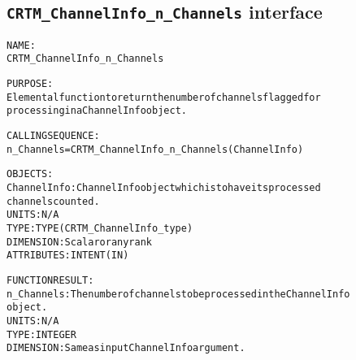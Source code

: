 \subsection{\texttt{CRTM\_ChannelInfo\_n\_Channels} interface}
  \label{sec:CRTM_ChannelInfo_n_Channels_interface}
  \begin{alltt}
 
  NAME:
        CRTM_ChannelInfo_n_Channels
 
  PURPOSE:
        Elemental function to return the number of channels flagged for 
        processing in a ChannelInfo object.
 
  CALLING SEQUENCE:
        n_Channels = CRTM_ChannelInfo_n_Channels( ChannelInfo )
 
  OBJECTS:
        ChannelInfo: ChannelInfo object which is to have its processed 
                     channels counted.
                     UNITS:      N/A
                     TYPE:       TYPE(CRTM_ChannelInfo_type)
                     DIMENSION:  Scalar or any rank
                     ATTRIBUTES: INTENT(IN)
 
  FUNCTION RESULT:
        n_Channels:  The number of channels to be processed in the ChannelInfo
                     object.
                     UNITS:      N/A
                     TYPE:       INTEGER
                     DIMENSION:  Same as input ChannelInfo argument.
 
  \end{alltt}
